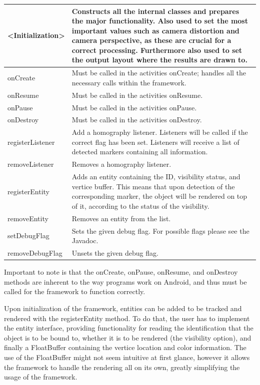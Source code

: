 {\footnotesize
\begin{tabulary}{\textwidth}{J || J}
<Initialization> & Constructs all the internal classes and prepares the major functionality. Also used to set the most important values such as camera distortion and camera perspective, as these are crucial for a correct processing. Furthermore also used to set the output layout where the results are drawn to.\\
\hline
onCreate & Must be called in the activities onCreate; handles all the necessary calls within the framework.\\
\hline
onResume & Must be called in the activities onResume.\\
\hline
onPause & Must be called in the activities onPause.\\
\hline
onDestroy & Must be called in the activities onDestroy.\\
\hline
registerListener & Add a homography listener. Listeners will be called if the correct flag has been set. Listeners will receive a list of detected markers containing all information.\\
\hline
removeListener & Removes a homography listener. \\
\hline
registerEntity & Adds an entity containing the ID, visibility status, and vertice buffer. This means that upon detection of the corresponding marker, the object will be rendered on top of it, according to the status of the visibility.\\
\hline
removeEntity & Removes an entity from the list.\\
\hline
setDebugFlag & Sets the given debug flag. For possible flags please see the Javadoc.\\
\hline
removeDebugFlag & Unsets the given debug flag.\\
\end{tabulary}
}

Important to note is that the onCreate, onPause, onResume, and onDestroy methods are inherent to the way programs work on Android, and thus must be called for the framework to function correctly.

Upon initialization of the framework, entities can be added to be tracked and rendered with the registerEntity method.
To do that, the user has to implement the entity interface, providing functionality for reading the identification that the object is to be bound to, whether it is to be rendered (the visibility option), and finally a FloatBuffer containing the vertice location and color information.
The use of the FloatBuffer might not seem intuitive at first glance, however it allows the framework to handle the rendering all on its own, greatly simplifying the usage of the framework.

